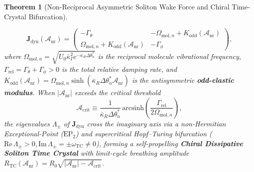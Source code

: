 \documentclass[11pt,letterpaper]{article}
\newtheorem{theorem}{Theorem}
\begin{document}
\begin{theorem}[Non-Reciprocal Asymmetric Soliton Wake Force and Chiral Time-Crystal Bifurcation]
\begin{enumerate}
    \begin{equation}
    \mathbf{J}_{\mathrm{dyn}}(\mathcal{A}_{\mathrm{nr}}) = \begin{pmatrix} -\Gamma_\theta & -\Omega_{\mathrm{mol},n} + K_{\mathrm{odd}}(\mathcal{A}_{\mathrm{nr}}) \\[4pt] \Omega_{\mathrm{mol},n} + K_{\mathrm{odd}}(\mathcal{A}_{\mathrm{nr}}) & -\Gamma_\phi \end{pmatrix},
    \label{eq:thm1_jacobian}
    \end{equation}
    where $\Omega_{\mathrm{mol},n} = \sqrt{U_0 \bar{\kappa}_I^2 e^{-\bar{\kappa}_R\Delta\theta_n^*}}$ is the reciprocal molecule vibrational frequency, $\Gamma_{\mathrm{rel}} = \Gamma_\theta + \Gamma_\phi > 0$ is the total relative damping rate, and $K_{\mathrm{odd}}(\mathcal{A}_{\mathrm{nr}}) = \Omega_{\mathrm{mol},n}\sinh(\bar{\kappa}_R\Delta\theta_n^* \mathcal{A}_{\mathrm{nr}})$ is the antisymmetric \textbf{odd-elastic modulus}. When $|\mathcal{A}_{\mathrm{nr}}|$ exceeds the critical threshold
    \begin{equation}
    \mathcal{A}_{\mathrm{crit}} \equiv \frac{1}{\bar{\kappa}_R \Delta\theta_n^*}\,\mathrm{arcsinh}\!\left(\frac{\Gamma_{\mathrm{rel}}}{2\Omega_{\mathrm{mol},n}}\right),
    \label{eq:thm1_Acrit}
    \end{equation}
    the eigenvalues $\Lambda_\pm$ of $\mathbf{J}_{\mathrm{dyn}}$ cross the imaginary axis via a non-Hermitian Exceptional-Point ($\mathrm{EP}_2$) and supercritical Hopf--Turing bifurcation ($\mathrm{Re}\,\Lambda_\pm > 0, \mathrm{Im}\,\Lambda_\pm = \pm\omega_{\mathrm{TC}} \neq 0$), forming a self-propelling \textbf{Chiral Dissipative Soliton Time Crystal} with limit-cycle breathing amplitude $R_{\mathrm{TC}}(\mathcal{A}_{\mathrm{nr}}) = R_0\sqrt{|\mathcal{A}_{\mathrm{nr}}| - \mathcal{A}_{\mathrm{crit}}}$.
\end{enumerate}
\end{theorem}
\end{document}
